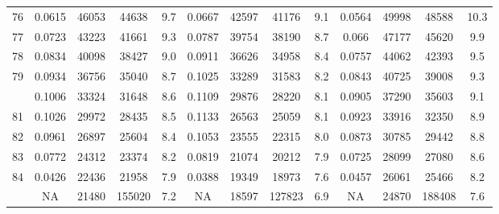 \documentclass[
  14pt,
]{article}
\begin{document}
\begin{longtable}[t]{lcccccccccccc}
76 & 0.0615 & 46053 & 44638 & 9.7 & 0.0667 & 42597 & 41176 & 9.1 & 0.0564 & 49998 & 48588 & 10.3\\
77 & 0.0723 & 43223 & 41661 & 9.3 & 0.0787 & 39754 & 38190 & 8.7 & 0.066 & 47177 & 45620 & 9.9\\
78 & 0.0834 & 40098 & 38427 & 9.0 & 0.0911 & 36626 & 34958 & 8.4 & 0.0757 & 44062 & 42393 & 9.5\\
79 & 0.0934 & 36756 & 35040 & 8.7 & 0.1025 & 33289 & 31583 & 8.2 & 0.0843 & 40725 & 39008 & 9.3\\
\addlinespace
80 & 0.1006 & 33324 & 31648 & 8.6 & 0.1109 & 29876 & 28220 & 8.1 & 0.0905 & 37290 & 35603 & 9.1\\
81 & 0.1026 & 29972 & 28435 & 8.5 & 0.1133 & 26563 & 25059 & 8.1 & 0.0923 & 33916 & 32350 & 8.9\\
82 & 0.0961 & 26897 & 25604 & 8.4 & 0.1053 & 23555 & 22315 & 8.0 & 0.0873 & 30785 & 29442 & 8.8\\
83 & 0.0772 & 24312 & 23374 & 8.2 & 0.0819 & 21074 & 20212 & 7.9 & 0.0725 & 28099 & 27080 & 8.6\\
84 & 0.0426 & 22436 & 21958 & 7.9 & 0.0388 & 19349 & 18973 & 7.6 & 0.0457 & 26061 & 25466 & 8.2\\
\addlinespace
85 & NA & 21480 & 155020 & 7.2 & NA & 18597 & 127823 & 6.9 & NA & 24870 & 188408 & 7.6\\*
\end{longtable}
\end{document}
